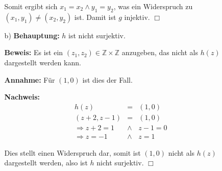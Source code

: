 \documentclass[a4paper,10pt]{scrartcl}
\begin{document}
\begin{enumerate}
\begin{enumerate}
                Somit ergibt sich $x_1 = x_2 \wedge y_1 = y_2$, was ein Widerspruch zu $(x_1, y_1) \not= (x_2, y_2)$ ist.
                Damit ist $g$ injektiv. $\Box$

            \item[b)]
                \textbf{Behauptung:} $h$ ist nicht surjektiv.

                \textbf{Beweis:} Es ist ein $(z_1, z_2) \in \mathbb{Z} \times \mathbb{Z}$ anzugeben, das nicht als $h(z)$
                dargestellt werden kann.

                \textbf{Annahme:} Für $(1, 0)$ ist dies der Fall.

                \textbf{Nachweis:}
                    $$\begin{array}{rcl}
                        h(z) &=& (1, 0)\\
                        (z + 2, z - 1) &=& (1, 0)\\
                        \Rightarrow z + 2 = 1 &\wedge& z - 1 = 0\\
                        \Rightarrow z = -1 &\wedge& z = 1
                    \end{array}$$

                    Dies stellt einen Widerspruch dar, somit ist $(1, 0)$ nicht als $h(z)$ dargestellt werden, also ist
                    $h$ nicht surjektiv. $\Box$



        \end{enumerate}


\end{enumerate}
\end{document}
